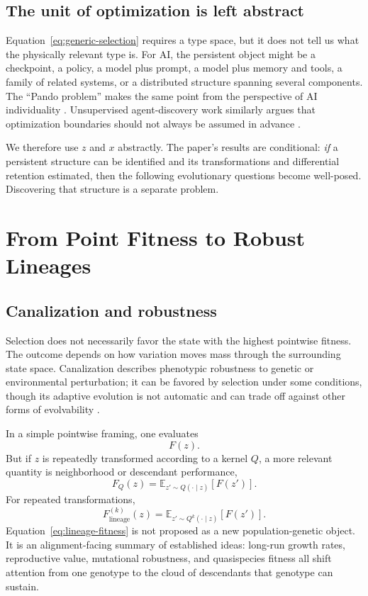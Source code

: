\documentclass[11pt]{article}
\newcommand{\E}{\mathbb{E}}
\begin{document}
\subsection{The unit of optimization is left abstract}

Equation~\eqref{eq:generic-selection} requires a type space, but it does not tell us what the physically relevant type is. For AI, the persistent object might be a checkpoint, a policy, a model plus prompt, a model plus memory and tools, a family of related systems, or a distributed structure spanning several components. The ``Pando problem'' makes the same point from the perspective of AI individuality \parencite{kulveit2025pando}. Unsupervised agent-discovery work similarly argues that optimization boundaries should not always be assumed in advance \parencite{zarncke2025uad}.

We therefore use $z$ and $x$ abstractly. The paper's results are conditional: \emph{if} a persistent structure can be identified and its transformations and differential retention estimated, then the following evolutionary questions become well-posed. Discovering that structure is a separate problem.

\section{From Point Fitness to Robust Lineages}

\subsection{Canalization and robustness}

Selection does not necessarily favor the state with the highest pointwise fitness. The outcome depends on how variation moves mass through the surrounding state space. Canalization describes phenotypic robustness to genetic or environmental perturbation; it can be favored by selection under some conditions, though its adaptive evolution is not automatic and can trade off against other forms of evolvability \parencite{flatt2005}.

In a simple pointwise framing, one evaluates
\begin{equation}
    F(z).
\end{equation}
But if $z$ is repeatedly transformed according to a kernel $Q$, a more relevant quantity is neighborhood or descendant performance,
\begin{equation}
    F_Q(z)
    =
    \E_{z'\sim Q(\cdot\mid z)}[F(z')].
    \label{eq:neighborhood-fitness}
\end{equation}
For repeated transformations,
\begin{equation}
    F^{(k)}_{\mathrm{lineage}}(z)
    =
    \E_{z'\sim Q^k(\cdot\mid z)}[F(z')].
    \label{eq:lineage-fitness}
\end{equation}
Equation~\eqref{eq:lineage-fitness} is not proposed as a new population-genetic object. It is an alignment-facing summary of established ideas: long-run growth rates, reproductive value, mutational robustness, and quasispecies fitness all shift attention from one genotype to the cloud of descendants that genotype can sustain.
\end{document}
